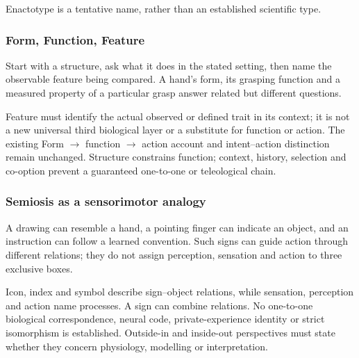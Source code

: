 \noindent Enactotype is a tentative name, rather than an established scientific type.\par


\subsubsection*{Form, Function, Feature}

\noindent Start with a structure, ask what it does in the stated setting, then name the observable feature being compared. A hand’s form, its grasping function and a measured property of a particular grasp answer related but different questions.\par

\noindent Feature must identify the actual observed or defined trait in its context; it is not a new universal third biological layer or a substitute for function or action. The existing Form \(\rightarrow\) function \(\rightarrow\) action account and intent–action distinction remain unchanged. Structure constrains function; context, history, selection and co-option prevent a guaranteed one-to-one or teleological chain.\par


\subsubsection*{Semiosis as a sensorimotor analogy}

\noindent A drawing can resemble a hand, a pointing finger can indicate an object, and an instruction can follow a learned convention. Such signs can guide action through different relations; they do not assign perception, sensation and action to three exclusive boxes.\par

\noindent Icon, index and symbol describe sign–object relations, while sensation, perception and action name processes. A sign can combine relations. No one-to-one biological correspondence, neural code, private-experience identity or strict isomorphism is established. Outside-in and inside-out perspectives must state whether they concern physiology, modelling or interpretation.\par



